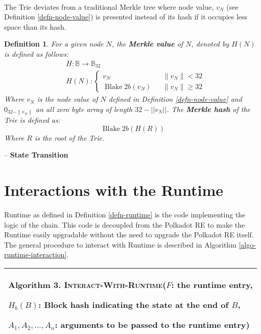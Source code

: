 \documentclass{article}
\newcommand{\chapter}[1]{\medskip\bigskip--\noindent\textbf{\huge #1}}
\newcommand{\tmname}[1]{\textsc{#1}}
\newcommand{\tmop}[1]{\ensuremath{\operatorname{#1}}}
\newcommand{\tmstrong}[1]{\textbf{#1}}
\newcommand{\tmtextbf}[1]{{\bfseries{#1}}}
\newcommand{\tmtextsc}[1]{{\scshape{#1}}}
\newcounter{tmcounter}
\newcommand{\custombinding}[1]{%
  \setcounter{tmcounter}{#1}%
  \addtocounter{tmcounter}{-1}%
  \refstepcounter{tmcounter}}
\newtheorem{definition}{Definition}
\providecommand{\tmname}[1]{\tmtextsc{#1}}
\providecommand{\tmop}[1]{\ensuremath{\mathrm{#1}}}
\providecommand{\tmstrong}[1]{\tmtextbf{#1}}
\providecommand{\tmtextbf}[1]{\tmtextbf{#1}}
\newtheorem{definition}{Definition}
\begin{document}
\

The Trie deviates from a traditional Merkle tree where node value, $v_N$ (see
Definition \ref{defn-node-value}) is presented instead of its hash if it
occupies less space than its hash.

\begin{definition}
  \label{defn-merkle-value}For a given node $N$, the {\tmstrong{Merkle value}}
  of $N$, denoted by $H (N)$ is defined as follows:
  \[ \begin{array}{ll}
       & H : \mathbb{B} \rightarrow \mathbb{B}_{32}\\
       & H (N) : \left\{ \begin{array}{lcl}
         v_N &  & \|v_N \|< 32\\
         \tmop{Blake} 2 b (v_N) &  & \|v_N \| \geqslant 32
       \end{array} \right.
     \end{array} \]
  Where $v_N$ is the node value of $N$ defined in Definition
  \ref{defn-node-value} and $0_{32 - \| v_N \|}$ an all zero byte array of
  length $32 - | | v_N | |$. The {\tmstrong{Merkle hash}} of the Trie is
  defined as:
  \[ \tmop{Blake} 2 b (H (R)) \]
  Where $R$ is the root of the Trie.
\end{definition}

\chapter{ State Transition}\label{chap-state-transit}

\section{Interactions with the Runtime}\label{sect-entries-into-runtime}

Runtime as defined in Definition \ref{defn-runtime} is the code implementing
the logic of the chain. This code is decoupled from the Polkadot RE to make
the Runtime easily upgradable without the need to upgrade the Polkadot RE
itself. The general procedure to interact with Runtime is described in
Algorithm \ref{algo-runtime-interaction}.

\custombinding{3}{\noindent}\begin{tabular}{l}
  \hline
  \tmtextbf{Algorithm  3. }
  \label{algo-runtime-interaction}{\tmname{Interact-With-Runtime}}($F$: the
  runtime entry,
  
  $H_b (B)$: Block hash indicating the state at the end of $B$,
  
  $A_1, A_2, \ldots, A_n$: arguments to be passed to the runtime entry)\\
  \hline
\end{tabular}
\end{document}
